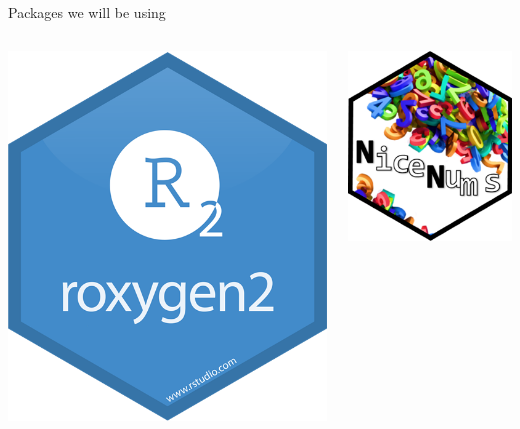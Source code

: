 \documentclass[11pt,a4paper]{beamer}
\begin{document}
\begin{frame}{Packages we will be using}
\begin{columns}
\begin{column}{0.20\textwidth}  
\begin{center}
\includegraphics[width=1\textwidth]{roxygen2}
\end{center}
\end{column}
\pause
\begin{column}{0.20\textwidth}  
\begin{center}
\includegraphics[width=1\textwidth]{newnice}

\end{center}
\end{column}
\end{columns}
\end{frame}
\end{document}
